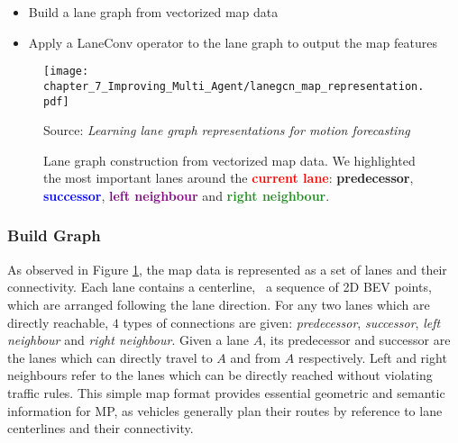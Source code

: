 \begin{itemize}
	\item Build a lane graph from vectorized map data
	\item Apply a LaneConv operator to the lane graph to output the map features
\end{itemize}

\begin{figure}[h] 
	\centering
	\texttt{[image: chapter\_7\_Improving\_Multi\_Agent/lanegcn\_map\_representation.pdf]}
	\caption[Lane graph construction from vectorized map data]{Lane graph construction from vectorized map data. We highlighted the most important lanes around the \textbf{\textcolor{red}{current lane}}: \textbf{\textcolor{YellowOrange}{predecessor}}, \textbf{\textcolor{blue}{successor}}, \textbf{\textcolor{purple}{left neighbour}} and \textbf{\textcolor{ForestGreen}{right neighbour}}.}
	Source: \textit{Learning lane graph representations for motion forecasting} \cite{liang2020learning}
	\label{fig:chapter_7_Improving_Multi_Agent/improving_efficiency_lanegcn_map_representation}
\end{figure}

\subsubsection{Build Graph}
\label{subsec:7_improving_efficiency_build_graph}

As observed in Figure \ref{fig:chapter_7_Improving_Multi_Agent/improving_efficiency_lanegcn_map_representation}, the map data is represented as a set of lanes and their connectivity. Each lane contains a centerline, \ie \ a sequence of 2D BEV points, which are arranged following the lane direction. For any two lanes which are directly reachable, $4$ types of connections are given: \textit{predecessor}, \textit{successor}, \textit{left neighbour} and \textit{right neighbour}. Given a lane $A$, its predecessor and successor are the lanes which can directly travel to $A$ and from $A$ respectively. Left and right neighbours refer to the  lanes which can be directly reached without violating traffic rules. This simple map format provides essential geometric and semantic information for \ac{MP}, as vehicles generally plan their routes by reference to lane centerlines and their connectivity. 

